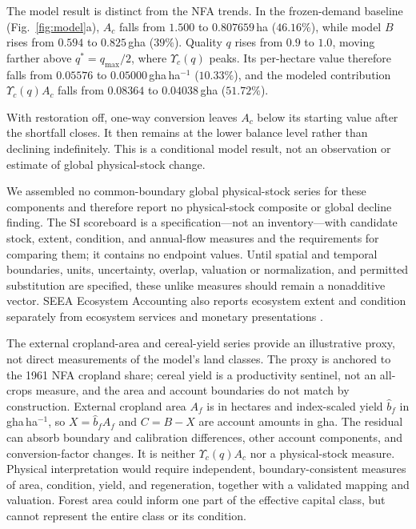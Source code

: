 \documentclass[preprint,12pt,authoryear]{elsarticle}
\newcommand{\Ups}{\Upsilon_c}
\begin{document}
The model result is distinct from the NFA trends. In the frozen-demand baseline (Fig.~\ref{fig:model}a), $A_c$ falls from $1.500$ to $0.807659$\,ha ($46.16\%$), while model $B$ rises from $0.594$ to $0.825$\,gha ($39\%$). Quality $q$ rises from $0.9$ to $1.0$, moving farther above $q^*=q_{\max}/2$, where $\Ups(q)$ peaks. Its per-hectare value therefore falls from $0.05576$ to $0.05000$\,gha\,ha$^{-1}$ ($10.33\%$), and the modeled contribution $\Ups(q)A_c$ falls from $0.08364$ to $0.04038$\,gha ($51.72\%$).

With restoration off, one-way conversion leaves $A_c$ below its starting value after the shortfall closes. It then remains at the lower balance level rather than declining indefinitely. This is a conditional model result, not an observation or estimate of global physical-stock change.

We assembled no common-boundary global physical-stock series for these components and therefore report no physical-stock composite or global decline finding. The SI scoreboard is a specification—not an inventory—with candidate stock, extent, condition, and annual-flow measures and the requirements for comparing them; it contains no endpoint values. Until spatial and temporal boundaries, units, uncertainty, overlap, valuation or normalization, and permitted substitution are specified, these unlike measures should remain a nonadditive vector. SEEA Ecosystem Accounting also reports ecosystem extent and condition separately from ecosystem services and monetary presentations \citep{UN2021SEEA_EA}.

The external cropland-area and cereal-yield series provide an illustrative proxy, not direct measurements of the model's land classes. The proxy is anchored to the 1961 NFA cropland share; cereal yield is a productivity sentinel, not an all-crops measure, and the area and account boundaries do not match by construction. External cropland area $A_f$ is in hectares and index-scaled yield $\hat b_f$ in gha\,ha$^{-1}$, so $X=\hat b_fA_f$ and $C=B-X$ are account amounts in gha. The residual can absorb boundary and calibration differences, other account components, and conversion-factor changes. It is neither $\Ups(q)A_c$ nor a physical-stock measure. Physical interpretation would require independent, boundary-consistent measures of area, condition, yield, and regeneration, together with a validated mapping and valuation. Forest area could inform one part of the effective capital class, but cannot represent the entire class or its condition.
\end{document}
